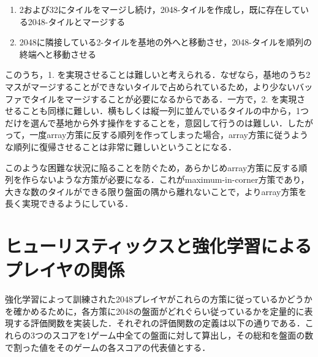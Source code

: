 \documentclass{suribt}
\begin{document}
\begin{enumerate}
\item 2および32にタイルをマージし続け，2048-タイルを作成し，既に存在している2048-タイルとマージする
\item 2048に隣接している2-タイルを基地の外へと移動させ，2048-タイルを順列の終端へと移動させる
\end{enumerate}

このうち，1. を実現させることは難しいと考えられる．なぜなら，基地のうち2マスがマージすることができないタイルで占められているため，より少ないバッファでタイルをマージすることが必要になるからである．一方で，2. を実現させることも同様に難しい．横もしくは縦一列に並んでいるタイルの中から，1つだけを選んで基地から外す操作をすることを，意図して行うのは難しい．したがって，一度array方策に反する順列を作ってしまった場合，array方策に従うような順列に復帰させることは非常に難しいということになる．

このような困難な状況に陥ることを防ぐため，あらかじめarray方策に反する順列を作らないような方策が必要になる．これがmaximum-in-corner方策であり，大きな数のタイルができる限り盤面の隅から離れないことで，よりarray方策を長く実現できるようにしている．

\section{ヒューリスティックスと強化学習によるプレイヤの関係}
強化学習によって訓練された2048プレイヤがこれらの方策に従っているかどうかを確かめるために，各方策に2048の盤面がどれぐらい従っているかを定量的に表現する評価関数を実装した．それぞれの評価関数の定義は以下の通りである．これらの3つのスコアを1ゲーム中全ての盤面に対して算出し，その総和を盤面の数で割った値をそのゲームの各スコアの代表値とする．
\end{document}
